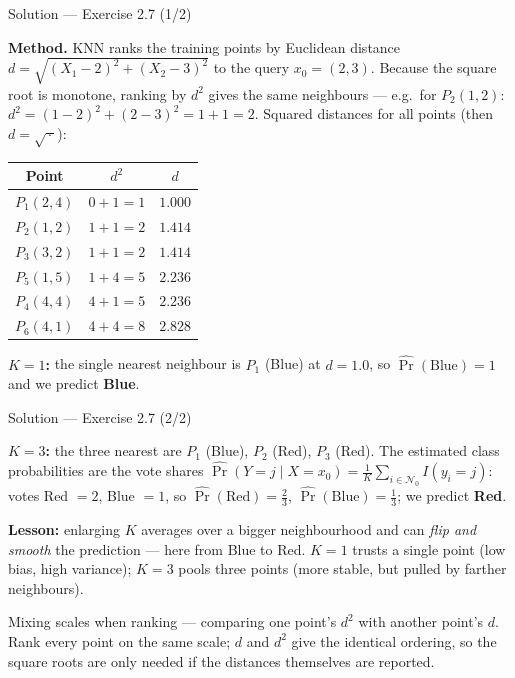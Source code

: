 \documentclass[aspectratio=169,11pt]{beamer}
\begin{document}
\begin{frame}{Solution --- Exercise 2.7 (1/2)}
\begin{solutionbox}
\textbf{Method.} KNN ranks the training points by Euclidean distance
$d=\sqrt{(X_1-2)^2+(X_2-3)^2}$ to the query $x_0=(2,3)$. Because the
square root is monotone, ranking by $d^2$ gives the same neighbours ---
e.g.\ for $P_2(1,2)$: $d^2=(1-2)^2+(2-3)^2=1+1=2$. Squared distances
for all points (then $d=\sqrt{\,\cdot\,}$):
\begin{center}\footnotesize
\begin{tabular}{ccc}
\toprule
Point & $d^2$ & $d$ \\
\midrule
$P_1(2,4)$ & $0+1=1$ & $1.000$ \\
$P_2(1,2)$ & $1+1=2$ & $1.414$ \\
$P_3(3,2)$ & $1+1=2$ & $1.414$ \\
$P_5(1,5)$ & $1+4=5$ & $2.236$ \\
$P_4(4,4)$ & $4+1=5$ & $2.236$ \\
$P_6(4,1)$ & $4+4=8$ & $2.828$ \\
\bottomrule
\end{tabular}
\end{center}
\textbf{$K=1$:} the single nearest neighbour is $P_1$ (Blue) at
$d=1.0$, so $\hat\Pr(\text{Blue})=1$ and we predict \textbf{Blue}.
\end{solutionbox}
\end{frame}

\begin{frame}{Solution --- Exercise 2.7 (2/2)}
\begin{solutionbox}
\textbf{$K=3$:} the three nearest are $P_1$ (Blue), $P_2$ (Red),
$P_3$ (Red). The estimated class probabilities are the vote shares
$\hat\Pr(Y=j\mid X=x_0)=\frac1K\sum_{i\in\mathcal N_0}I(y_i=j)$:
votes Red $=2$, Blue $=1$, so
$\hat\Pr(\text{Red})=\tfrac23$, $\hat\Pr(\text{Blue})=\tfrac13$; we
predict \textbf{Red}.

\textbf{Lesson:} enlarging $K$ averages over a bigger neighbourhood
and can \emph{flip and smooth} the prediction --- here from Blue to
Red. $K=1$ trusts a single point (low bias, high variance); $K=3$
pools three points (more stable, but pulled by farther neighbours).
\end{solutionbox}
\begin{mistake}
Mixing scales when ranking --- comparing one
point's $d^2$ with another point's $d$. Rank every point on the same
scale; $d$ and $d^2$ give the identical ordering, so the square roots
are only needed if the distances themselves are reported.
\end{mistake}
\end{frame}
\end{document}
